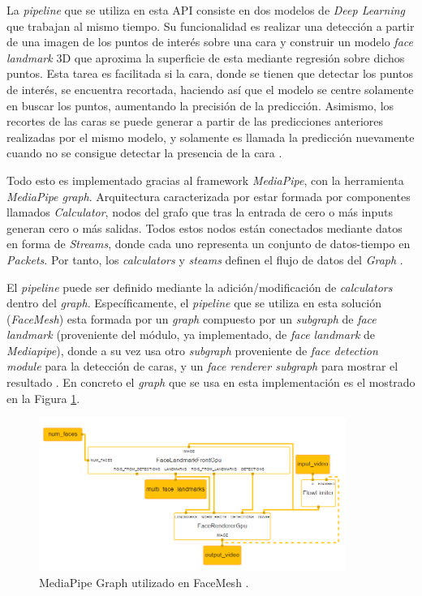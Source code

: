 La \textit{pipeline} que se utiliza en esta API consiste en dos modelos de \textit{Deep Learning} que trabajan al mismo tiempo. Su funcionalidad es realizar una detección a partir de una imagen de los puntos de interés sobre una cara y construir un modelo \textit{face landmark} 3D que aproxima la superficie de esta mediante regresión sobre dichos puntos. Esta tarea es facilitada si la cara, donde se tienen que detectar los puntos de interés, se encuentra recortada, haciendo así que el modelo se centre solamente en buscar los puntos, aumentando la precisión de la predicción. Asimismo, los recortes de las caras se puede generar a partir de las predicciones anteriores realizadas por el mismo modelo, y solamente es llamada la predicción nuevamente cuando no se consigue detectar la presencia de la cara \cite{faceMesh}.

Todo esto es implementado gracias al framework \textit{MediaPipe}, con la herramienta \textit{MediaPipe graph}. Arquitectura caracterizada por estar formada por componentes llamados \textit{Calculator}, nodos del grafo que tras la entrada de cero o más inputs generan cero o más salidas. Todos estos nodos están conectados mediante datos en forma de \textit{Streams}, donde cada uno representa un conjunto de datos-tiempo en \textit{Packets}. Por tanto, los \textit{calculators} y \textit{steams} definen el flujo de datos del \textit{Graph} \cite{mediapipe}. 

El \textit{pipeline} puede ser definido mediante la adición/modificación de \textit{calculators} dentro del \textit{graph}. Específicamente, el \textit{pipeline} que se utiliza en esta solución (\textit{FaceMesh}) esta formada por un \textit{graph} compuesto por un \textit{subgraph} de \textit{face landmark} (proveniente del módulo, ya implementado, de \textit{face landmark} de \textit{Mediapipe}), donde a su vez usa otro \textit{subgraph} proveniente de \textit{face detection module} para la detección de caras, y un \textit{face renderer subgraph} para mostrar el resultado \cite{faceMesh}. En concreto el \textit{graph} que se usa en esta implementación es el mostrado en la Figura \ref{fig:faceMesh}.

\begin{figure}[htp]
	\centering
	\includegraphics[width=10cm]{imagenes/faceMesh.png}
	\caption{MediaPipe Graph utilizado en FaceMesh \cite{mpGraph}.}
	\label{fig:faceMesh}
\end{figure}

